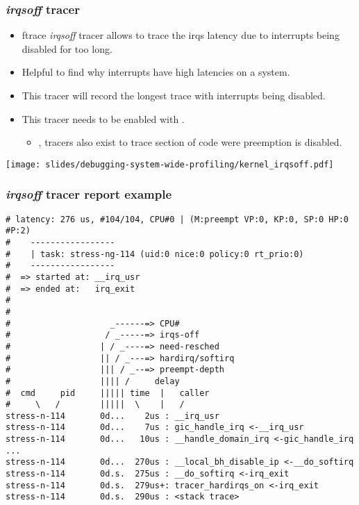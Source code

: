 \begin{frame}
  \frametitle{{\em irqsoff} tracer}
  \begin{itemize}
    \item ftrace {\em irqsoff} tracer allows to trace the irqs latency due to
          interrupts being disabled for too long.
    \item Helpful to find why interrupts have high latencies on a system.
    \item This tracer will record the longest trace with interrupts being disabled.
    \item This tracer needs to be enabled with .
    \begin{itemize}
      \item {},  tracers also exist to trace
            section of code were preemption is disabled.
    \end{itemize}
  \end{itemize}
  \center\texttt{[image: slides/debugging-system-wide-profiling/kernel\_irqsoff.pdf]}
\end{frame}

\begin{frame}[fragile]
  \frametitle{{\em irqsoff} tracer report example}
  \begin{block}{}
    \begin{verbatim}
# latency: 276 us, #104/104, CPU#0 | (M:preempt VP:0, KP:0, SP:0 HP:0 #P:2)
#    -----------------
#    | task: stress-ng-114 (uid:0 nice:0 policy:0 rt_prio:0)
#    -----------------
#  => started at: __irq_usr
#  => ended at:   irq_exit
#
#
#                    _------=> CPU#            
#                   / _-----=> irqs-off        
#                  | / _----=> need-resched    
#                  || / _---=> hardirq/softirq 
#                  ||| / _--=> preempt-depth   
#                  |||| /     delay            
#  cmd     pid     ||||| time  |   caller      
#     \   /        |||||  \    |   /         
stress-n-114       0d...    2us : __irq_usr
stress-n-114       0d...    7us : gic_handle_irq <-__irq_usr
stress-n-114       0d...   10us : __handle_domain_irq <-gic_handle_irq
...
stress-n-114       0d...  270us : __local_bh_disable_ip <-__do_softirq
stress-n-114       0d.s.  275us : __do_softirq <-irq_exit
stress-n-114       0d.s.  279us+: tracer_hardirqs_on <-irq_exit
stress-n-114       0d.s.  290us : <stack trace>
    \end{verbatim}
  \end{block}
\end{frame}

